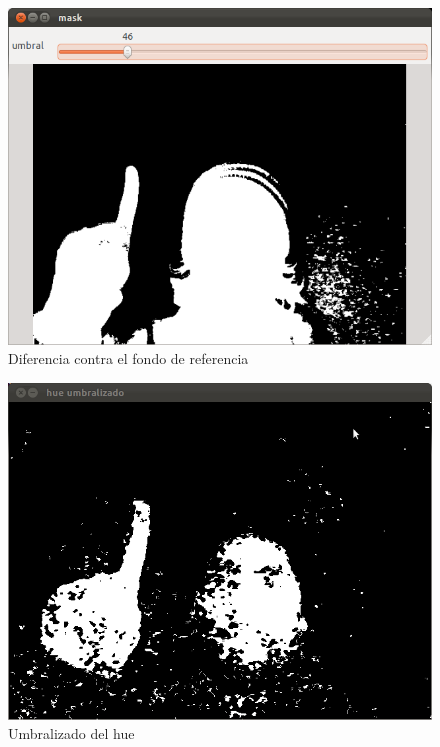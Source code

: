\documentclass[conference,a4paper,10pt,oneside,final]{tfmpd}
\begin{document}
	\begin{figure}[tbhp]
	\centerline{\includegraphics[scale=0.2]{3_mask}}
	\caption{Diferencia contra el fondo de referencia}
	\label{fig:diferenciacion}
	\end{figure}
	

	\begin{figure}[tbhp]
	\centerline{\includegraphics[scale=0.2]{2_hue_umbralizado}}
	\caption{Umbralizado del hue}
	\label{fig:hue_umbral}
	\end{figure}
	
\end{document}
